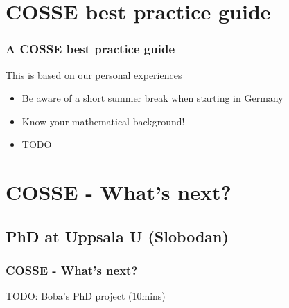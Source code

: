 \documentclass{beamer}
\begin{document}
\section{COSSE best practice guide}
\begin{frame}
\frametitle{A COSSE best practice guide}
This is based on our personal experiences
\begin{itemize}
 \item Be aware of a short summer break when starting in Germany
 \pause
 \item Know your mathematical background!
 \pause
 \item TODO
\end{itemize}

\end{frame}

\section{COSSE - What's next?}
\subsection{PhD at Uppsala U (Slobodan)}
\begin{frame}
\frametitle{COSSE - What's next?}
 TODO: Boba's PhD project (10mins)
\end{frame}
\end{document}
